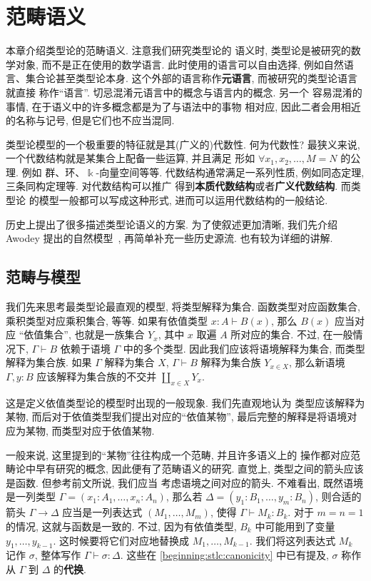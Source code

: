 \chapter{范畴语义}

本章介绍类型论的范畴语义. 注意我们研究类型论的
语义时, 类型论是被研究的数学对象, 而不是正在使用的数学语言.
此时使用的语言可以自由选择, 例如自然语言、集合论甚至类型论本身.
这个外部的语言称作\textbf{元语言}, 而被研究的类型论语言就直接
称作“语言”. 切忌混淆元语言中的概念与语言内的概念. 另一个
容易混淆的事情, 在于语义中的许多概念都是为了与语法中的事物
相对应, 因此二者会用相近的名称与记号, 但是它们也不应当混同.

类型论模型的一个极重要的特征就是其(广义的)代数性. 何为代数性?
最狭义来说, 一个代数结构就是某集合上配备一些运算, 并且满足
形如 \(\forall x_1, x_2, \dots, M = N\) 的公理. 例如
群、环、\(\Bbbk\)-向量空间等等. 代数结构通常满足一系列性质,
例如同态定理, 三条同构定理等. 对代数结构可以推广
得到\textbf{本质代数结构}或者\textbf{广义代数结构}. 而类型论
的模型一般都可以写成这种形式, 进而可以运用代数结构的一般结论.

历史上提出了很多描述类型论语义的方案. 为了使叙述更加清晰,
我们先介绍 Awodey 提出的自然模型~\cite{awodey:2018:natural},
再简单补充一些历史源流.
\cite{newstead:2018:natmod-poly} 也有较为详细的讲解.

\section{范畴与模型}

我们先来思考最类型论最直观的模型, 将类型解释为集合.
函数类型对应函数集合, 乘积类型对应乘积集合, 等等.
如果有依值类型 \(x{:}A \vdash B(x)\), 那么 \(B(x)\)
应当对应 “依值集合”, 也就是一族集合 \(Y_x\), 其中 \(x\)
取遍 \(A\) 所对应的集合.
不过, 在一般情况下, \(\Gamma \vdash B\) 依赖于语境
\(\Gamma\) 中的多个类型. 因此我们应该将语境解释为集合,
而类型解释为集合族. 如果 \(\Gamma\) 解释为集合 \(X\),
\(\Gamma \vdash B\) 解释为集合族 \(Y_{x \in X}\),
那么新语境 \(\Gamma, y{:}B\) 应该解释为集合族的不交并
\(\coprod_{x \in X} Y_x\).

这是定义依值类型论的模型时出现的一般现象. 我们先直观地认为
类型应该解释为某物, 而后对于依值类型我们提出对应的“依值某物”,
最后完整的解释是将语境对应为某物, 而类型对应于依值某物.

一般来说, 这里提到的“某物”往往构成一个范畴, 并且许多语义上的
操作都对应范畴论中早有研究的概念, 因此便有了范畴语义的研究.
直觉上, 类型之间的箭头应该是函数. 但参考前文所说, 我们应当
考虑语境之间对应的箭头. 不难看出, 既然语境是一列类型
\(\Gamma = (x_1{:}A_1, \dots, x_n{:}A_n)\),
那么若 \(\Delta = (y_1{:}B_1, \dots, y_m{:}B_n)\),
则合适的箭头 \(\Gamma \to \Delta\) 应当是一列表达式
\((M_1, \dots, M_m)\), 使得 \(\Gamma \vdash M_k : B_k\).
对于 $m = n = 1$ 的情况, 这就与函数是一致的.
不过, 因为有依值类型, \(B_k\) 中可能用到了变量 \(y_1, \dots, y_{k-1}\).
这时候要将它们对应地替换成 \(M_1, \dots, M_{k-1}\).
我们将这列表达式 \(M_k\) 记作 \(\sigma\),
整体写作 \(\Gamma \vdash \sigma : \Delta\).
这些在 \ref{beginning:stlc:canonicity} 中已有提及,
\(\sigma\) 称作从 \(\Gamma\) 到 \(\Delta\) 的\textbf{代换}.

